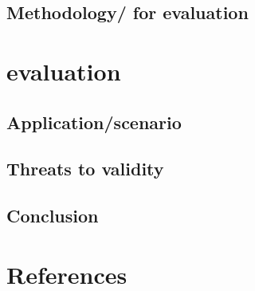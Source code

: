 \documentclass[conference]{IEEEtran}
\begin{document}
\subsection{Methodology/ for evaluation}


\section{evaluation}


\subsection{Application/scenario}\label{AA}

\subsection{Threats to validity}


\subsection{Conclusion}

\section*{References}
\end{document}
